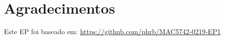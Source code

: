 \documentclass[final,12pt,a4paper]{elsarticle}
\begin{document}
\section{Agradecimentos}

Este EP foi baseado em: \url{https://github.com/phrb/MAC5742-0219-EP1}









\end{document}

